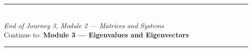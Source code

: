 \documentclass[12pt, a4paper]{article}
\begin{document}
\vspace{1.4cm}
\begin{center}
{\color{MidBlue}\rule{0.5\linewidth}{0.8pt}}\\[6pt]
{\small\color{DarkGrey}\textit{End of Journey 3, Module 2 --- Matrices and Systems}}\\[4pt]
{\small\color{DarkGrey}Continue to: \textbf{Module 3 --- Eigenvalues and Eigenvectors}}\\[6pt]
{\color{MidBlue}\rule{0.5\linewidth}{0.8pt}}
\end{center}
\end{document}
